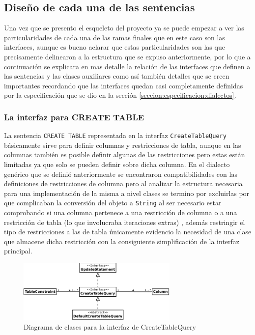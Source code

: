 \subsection{Diseño de cada una de las sentencias}
Una vez que se presento el esqueleto del proyecto ya se puede empezar a ver las particularidades de cada una de las ramas finales que en este caso son las interfaces, aunque es bueno aclarar que estas particularidades son las que precisamente delinearon a la estructura que se expuso anteriormente, por lo que a continuación se explicara en mas detalle la relación de las interfaces que definen a las sentencias y las clases auxiliares como así también detalles que se creen importantes recordando que las interfaces quedan casi completamente definidas por la especificación que se dio en la sección \ref{seccion:especificacion:dialectos}.

\subsubsection{La interfaz para CREATE TABLE}
La sentencia \verb=CREATE TABLE= representada en la interfaz \verb=CreateTableQuery= básicamente sirve para definir columnas y restricciones de tabla, aunque en las columnas también es posible definir algunas de las restricciones pero estas están limitadas ya que solo se pueden definir sobre dicha columna. En el dialecto genérico que se definió anteriormente se encontraron compatibilidades con las definiciones de restricciones de columna pero al analizar la estructura necesaria para una implementación de la misma a nivel clases se termino por excluirlas por que complicaban la conversión del objeto a \verb=String= al ser necesario estar comprobando si una columna pertenece a una restricción de columna o a una restricción de tabla (lo que involucraba iteraciones extras) , además restringir el tipo de restricciones a las de tabla únicamente evidencio la  necesidad de una clase que almacene dicha restricción con la consiguiente simplificación de la interfaz principal.


\begin{figure}
  \centering
    \includegraphics[width=0.7\textwidth]{figuras/jdbgm-dc-createtable.png}
  \caption{Diagrama de clases para la interfaz de CreateTableQuery}
  \label{fig:dc-createtable}
\end{figure}



